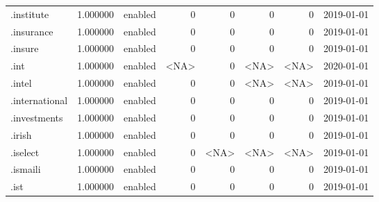 \begin{tabular}{lrlrrrrl}
.institute                &          1.000000 &         enabled &                           0 &                           0 &                           0 &                   0 &           2019-01-01 \\
.insurance                &          1.000000 &         enabled &                           0 &                           0 &                           0 &                   0 &           2019-01-01 \\
.insure                   &          1.000000 &         enabled &                           0 &                           0 &                           0 &                   0 &           2019-01-01 \\
.int                      &          1.000000 &         enabled &                        <NA> &                           0 &                        <NA> &                <NA> &           2020-01-01 \\
.intel                    &          1.000000 &         enabled &                           0 &                           0 &                        <NA> &                <NA> &           2019-01-01 \\
.international            &          1.000000 &         enabled &                           0 &                           0 &                           0 &                   0 &           2019-01-01 \\
.investments              &          1.000000 &         enabled &                           0 &                           0 &                           0 &                   0 &           2019-01-01 \\
.irish                    &          1.000000 &         enabled &                           0 &                           0 &                           0 &                   0 &           2019-01-01 \\
.iselect                  &          1.000000 &         enabled &                           0 &                        <NA> &                        <NA> &                <NA> &           2019-01-01 \\
.ismaili                  &          1.000000 &         enabled &                           0 &                           0 &                           0 &                   0 &           2019-01-01 \\
.ist                      &          1.000000 &         enabled &                           0 &                           0 &                           0 &                   0 &           2019-01-01 \\

\end{tabular}
